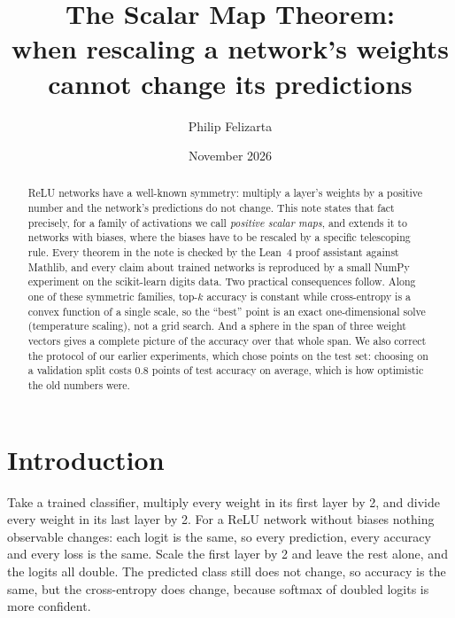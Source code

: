 \documentclass[11pt]{article}
\title{The Scalar Map Theorem:\\ when rescaling a network's weights cannot change its predictions}
\author{Philip Felizarta}
\date{November 2026}
\theoremstyle{definition}
\theoremstyle{remark}
\begin{document}
\sloppy
\maketitle

\begin{abstract}
ReLU networks have a well-known symmetry: multiply a layer's weights by a positive number and the
network's predictions do not change. This note states that fact precisely, for a family of
activations we call \emph{positive scalar maps}, and extends it to networks with biases, where
the biases have to be rescaled by a specific telescoping rule. Every theorem in the note is
checked by the Lean~4 proof assistant against Mathlib, and every claim about trained networks is
reproduced by a small NumPy experiment on the scikit-learn digits data. Two practical
consequences follow. Along one of these symmetric families, top-$k$ accuracy is constant while
cross-entropy is a convex function of a single scale, so the ``best'' point is an exact
one-dimensional solve (temperature scaling), not a grid search. And a sphere in the span of three
weight vectors gives a complete picture of the accuracy over that whole span. We also correct the
protocol of our earlier experiments, which chose points on the test set: choosing on a validation
split costs 0.8 points of test accuracy on average, which is how optimistic the old numbers were.
\end{abstract}

\section{Introduction}

Take a trained classifier, multiply every weight in its first layer by 2, and divide every weight
in its last layer by 2. For a ReLU network without biases nothing observable changes: each logit
is the same, so every prediction, every accuracy and every loss is the same. Scale the first layer
by 2 and leave the rest alone, and the logits all double. The predicted class still does not
change, so accuracy is the same, but the cross-entropy does change, because softmax of doubled
logits is more confident.
\end{document}
